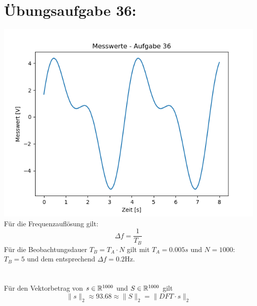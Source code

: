 

	\section*{Übungsaufgabe 36:}
		\includegraphics[width = \textwidth]{A36_Zeit-App-Plot.png}
		Für die Frequenzauflösung gilt:
		$$\Delta f = \frac{1}{T_B}$$
		Für die Beobachtungsdauer $T_B = T_A\cdot N$ gilt mit $T_A = 0.005s$ und $N = 1000$: $T_B = 5$ und dem entsprechend $\Delta f = 0.2\text{Hz}$.\\
		\\
		\\
		Für den Vektorbetrag von $s\in{\mathbb R}^{1000}$ und $S\in{\mathbb R}^{1000}$ gilt 
		$$\|s\|_{2} \approx 93.68 \approx \|S\|_2 = \|DFT\cdot s\|_2$$
